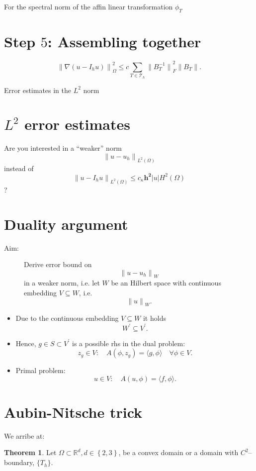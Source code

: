 \documentclass[
	a4paper,
	11pt,
	oneside
]{scrreprt}
\theoremstyle{definition}
\newtheorem{theorem}{Theorem}
\begin{document}
For the spectral norm of the affin linear transformation $\phi_{T}$

\section{Step $5$: Assembling together}

\[ {\|\nabla\left(u-I_{h}u\right)\|}^{2}_{\Omega}\le c\sum_{T\in\mathcal{T}_{h}}{\|B_{T}^{-1}\|}^{2}_{F}\|B_{T}\|. \]

Error estimates in the $L^{2}$ norm

\section{$L^{2}$ error estimates}

Are you interested in a ``weaker'' norm \[ {\|u-u_{h}\|}_{L^{2}\left(\Omega\right)} \] instead of \[ {\|u-I_{h}u\|}_{L^{2}\left(\Omega\right)}\le c_{\kappa}\bm{h^{2}}|u|H^{2}\left(\Omega\right) \] ?


\section{Duality argument}

\begin{description}
	\item[Aim:] Derive error bound on \[ {\|u-u_{h}\|}_{W} \] in a weaker norm, i.e. let $W$ be an Hilbert space with continuous embedding $V\subseteq W$, i.e. \[ {\|u\|}_{W}. \]
\end{description}

\begin{itemize}
	\item Due to the continuous embedding $V\subseteq W$ it holds \[ W^{\prime}\subseteq V^{\prime}. \]
	\item Hence, $g\in S\subset V^{\prime}$ is a possible rhs in the dual problem: \[ z_{g}\in V\colon\quad A\left(\phi, z_{g}\right)=\langle g,\phi\rangle\quad\forall\phi\in V. \]
	\item Primal problem: \[ u\in V\colon\quad A\left(u,\phi\right)=\langle f,\phi\rangle. \]
\end{itemize}

\section{Aubin-Nitsche trick}
We arribe at:
\begin{theorem}
Let $\Omega\subset\mathbb{R}^{d},d\in\left\{2,3\right\}$, be a convex domain or a domain with $C^{2}$--boundary, $\{T_{h}\}$.
\end{theorem}
\end{document}
